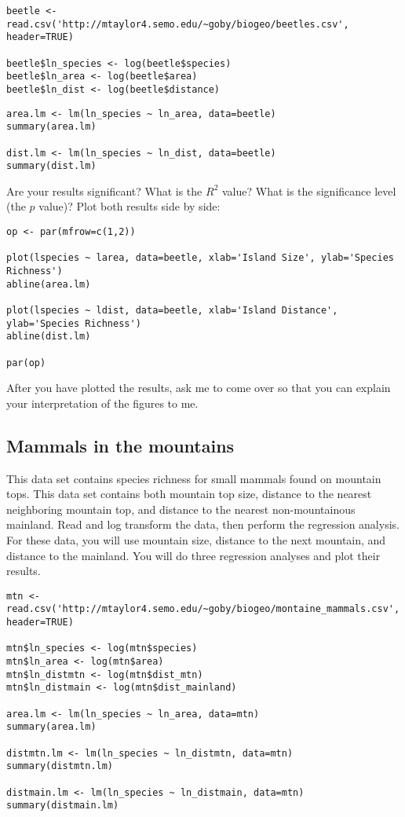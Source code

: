 \documentclass[11pt]{article}
\begin{document}
\begin{verbatim}
beetle <- read.csv('http://mtaylor4.semo.edu/~goby/biogeo/beetles.csv', header=TRUE)

beetle$ln_species <- log(beetle$species)
beetle$ln_area <- log(beetle$area)
beetle$ln_dist <- log(beetle$distance)

\end{verbatim}

\begin{verbatim}
area.lm <- lm(ln_species ~ ln_area, data=beetle)
summary(area.lm)

dist.lm <- lm(ln_species ~ ln_dist, data=beetle)
summary(dist.lm)

\end{verbatim}

Are your results significant?  What is the $R^2$ value?  What is the significance level (the $p$ value)?  Plot both results side by side:

\begin{verbatim}
op <- par(mfrow=c(1,2))

plot(lspecies ~ larea, data=beetle, xlab='Island Size', ylab='Species Richness')
abline(area.lm)

plot(lspecies ~ ldist, data=beetle, xlab='Island Distance', ylab='Species Richness')
abline(dist.lm)

par(op)
\end{verbatim}

After you have plotted the results, ask me to come over so that you can explain your interpretation of the figures to me.

\subsection*{Mammals in the mountains}

This data set contains species richness for small mammals found on mountain tops. This data set contains both mountain top size, distance to the nearest neighboring mountain top, and distance to the nearest non-mountainous mainland.  Read and log transform the data, then perform the regression analysis.  For these data, you will use mountain size, distance to the next mountain, and distance to the mainland.  You will do three regression analyses and plot their results.


\begin{verbatim}
mtn <- read.csv('http://mtaylor4.semo.edu/~goby/biogeo/montaine_mammals.csv', header=TRUE)

mtn$ln_species <- log(mtn$species)
mtn$ln_area <- log(mtn$area)
mtn$ln_distmtn <- log(mtn$dist_mtn)
mtn$ln_distmain <- log(mtn$dist_mainland)

area.lm <- lm(ln_species ~ ln_area, data=mtn)
summary(area.lm)

distmtn.lm <- lm(ln_species ~ ln_distmtn, data=mtn)
summary(distmtn.lm)

distmain.lm <- lm(ln_species ~ ln_distmain, data=mtn)
summary(distmain.lm)

\end{verbatim}
\end{document}
